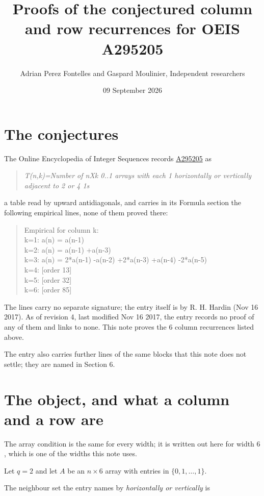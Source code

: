 \documentclass[11pt]{article}
\title{Proofs of the conjectured column and row recurrences for OEIS A295205}
\author{Adrian Perez Fontelles and Gaspard Moulinier, Independent researchers}
\date{09 September 2026}
\theoremstyle{definition}
\begin{document}
\maketitle
\section{The conjectures}

The Online Encyclopedia of Integer Sequences records \href{https://oeis.org/A295205}{A295205} as

\begin{quote}\itshape T(n,k)=Number of nXk 0..1 arrays with each 1 horizontally or vertically adjacent to 2 or 4 1s\end{quote}

a table read by upward antidiagonals, and carries in its Formula section the following empirical lines, none of them proved there:

\begin{quote}\ttfamily Empirical for column k:\\
k=1: a(n) = a(n-1)\\k=2: a(n) = a(n-1) +a(n-3)\\k=3: a(n) = 2*a(n-1) -a(n-2) +2*a(n-3) +a(n-4) -2*a(n-5)\\k=4: [order 13]\\k=5: [order 32]\\k=6: [order 85]\end{quote}

The lines carry no separate signature; the entry itself is by R. H. Hardin (Nov 16 2017). As of revision 4, last modified Nov 16 2017, the entry records no proof of any of them and links to none. This note proves the 6 column recurrences listed above.

The entry also carries further lines of the same blocks that this note does not settle; they are named in Section 6.

\section{The object, and what a column and a row are}

The array condition is the same for every width; it is written out here for width $6$, which is one of the widths this note uses.

Let $q = 2$ and let $A$ be an $n \times 6$ array with entries in $\{0,1,\dots,1\}$.

The neighbour set the entry names by {\itshape horizontally or vertically} is
\end{document}
